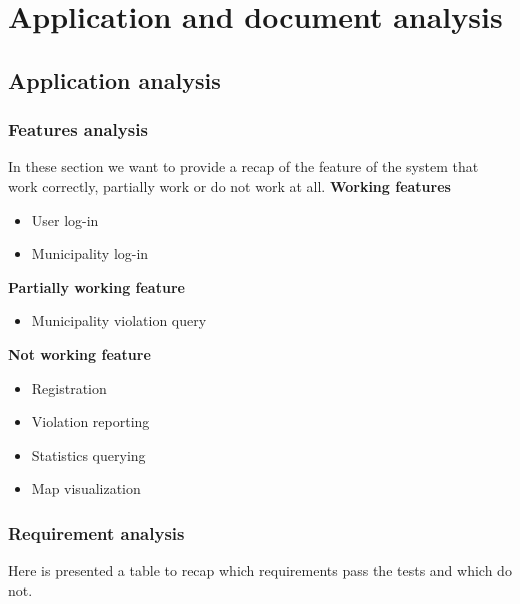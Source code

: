 \documentclass[../ATD.tex]{subfiles}
\begin{document}
    \chapter{Application and document analysis}\label{ch:application-and-document-analysis}
    \section{Application analysis}\label{sec:application-analysis}
    \subsection{Features analysis}\label{subsec:feature-analysis}
    In these section we want to provide a recap of the feature of the system that work correctly, partially work or do not work at all.
    \newline
    \textbf{Working features}
    \begin{itemize}
        \item User log-in
        \item Municipality log-in
    \end{itemize}
    \newline
    \textbf{Partially working feature}
    \begin{itemize}
        \item Municipality violation query
    \end{itemize}
    \newline
    \textbf{Not working feature}
    \begin{itemize}
        \item Registration
        \item Violation reporting
        \item Statistics querying
        \item Map visualization
    \end{itemize}
    \subsection{Requirement analysis}\label{subsec:requirement-analysis}
    Here is presented a table to recap which requirements pass the tests and which do not.
\end{document}
